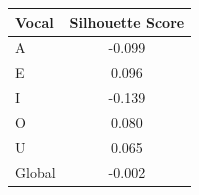 \begin{tabular}{lc}
\toprule
\rowcolor{col01}
Vocal & Silhouette Score \\
\midrule
A & -0.099 \\
E & 0.096 \\
I & -0.139 \\
O & 0.080 \\
U & 0.065 \\
Global & -0.002 \\
\bottomrule
\end{tabular}
